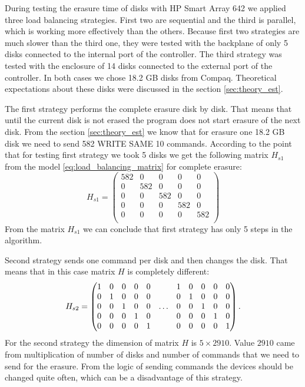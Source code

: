 During testing the erasure time of disks with HP Smart Array 642 we applied three load balancing strategies. First two are sequential and the third is parallel, which is working more effectively than the others. Because first two strategies are much slower than the third one, they were tested with the backplane of only 5 disks connected to the internal port of the controller. The third strategy was tested with the enclosure of 14 disks connected to the external port of the controller. In both cases we chose 18.2 GB disks from Compaq. Theoretical expectations about these disks were discussed in the section \ref{sec:theory_est}.

The first strategy performs the complete erasure disk by disk. That means that until the current disk is not erased the program does not start erasure of the next disk. From the section \ref{sec:theory_est} we know that for erasure one 18.2 GB disk we need to send 582 WRITE SAME 10 commands. According to the point that for testing first strategy we took 5 disks we get the following matrix $H_{s1}$ from the model \ref{eq:load_balancing_matrix} for complete erasure:
\begin{equation}
	H_{s1} =
	\begin{pmatrix}
		582 & 0 & 0 & 0 & 0\\
		0 & 582 & 0 & 0 & 0\\
		0 & 0 & 582 & 0 & 0\\
		0 & 0 & 0 & 582 & 0 \\
		0 & 0 & 0 & 0 & 582 \\
	\end{pmatrix}
\end{equation}
From the matrix $H_{s1}$ we can conclude that first strategy has only 5 steps in the algorithm.


Second strategy sends one command per disk and then changes the disk. That means that in this case
matrix $H$ is completely different:
\begin{equation}
\setcounter{MaxMatrixCols}{13}
	H_{s2} =
	\begin{pmatrix}
		1 & 0 & 0 & 0 & 0 &&  		1 & 0 & 0 & 0 & 0 \\
		0 & 1 & 0 & 0 & 0 &&  		0 & 1 & 0 & 0 & 0 \\
		0 & 0 & 1 & 0 & 0 &\ldots&   0 & 0 & 1 & 0 & 0 \\
		0 & 0 & 0 & 1 & 0 &&  		0 & 0 & 0 & 1 & 0 \\
		0 & 0 & 0 & 0 & 1 &&  		0 & 0 & 0 & 0 & 1 \\
	\end{pmatrix}.
\end{equation}
For the second strategy the dimension of matrix $H$ is $5\times2910$. Value $2910$ came from multiplication of number of disks and number of commands that we need to send for the erasure. From the logic of sending commands the devices should be changed quite often, which can be a disadvantage of this strategy. 


